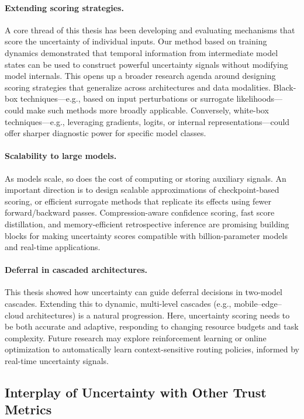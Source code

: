 \paragraph{Extending scoring strategies.} A core thread of this thesis has been developing and evaluating mechanisms that score the uncertainty of individual inputs. Our method based on training dynamics demonstrated that temporal information from intermediate model states can be used to construct powerful uncertainty signals without modifying model internals. This opens up a broader research agenda around designing scoring strategies that generalize across architectures and data modalities. Black-box techniques—e.g., based on input perturbations or surrogate likelihoods—could make such methods more broadly applicable. Conversely, white-box techniques—e.g., leveraging gradients, logits, or internal representations—could offer sharper diagnostic power for specific model classes.

\paragraph{Scalability to large models.} As models scale, so does the cost of computing or storing auxiliary signals. An important direction is to design scalable approximations of checkpoint-based scoring, or efficient surrogate methods that replicate its effects using fewer forward/backward passes. Compression-aware confidence scoring, fast score distillation, and memory-efficient retrospective inference are promising building blocks for making uncertainty scores compatible with billion-parameter models and real-time applications.

\paragraph{Deferral in cascaded architectures.} This thesis showed how uncertainty can guide deferral decisions in two-model cascades. Extending this to dynamic, multi-level cascades (e.g., mobile–edge–cloud architectures) is a natural progression. Here, uncertainty scoring needs to be both accurate and adaptive, responding to changing resource budgets and task complexity. Future research may explore reinforcement learning or online optimization to automatically learn context-sensitive routing policies, informed by real-time uncertainty signals.

\subsection{Interplay of Uncertainty with Other Trust Metrics}

